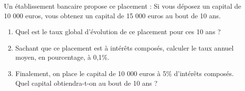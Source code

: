  
Un établissement bancaire propose ce placement :
Si vous déposez un capital de 10 000 euros, vous obtenez un capital de 15 000 euros au bout de 10 ans.
\begin{enumerate} 
\item Quel est le taux global d'évolution de ce placement pour ces 10 ans ?
\item Sachant que ce placement est à intérêts composés, calculer le taux annuel moyen, en pourcentage, à 0,1\%.
\item Finalement, on place le capital de 10 000 euros à 5\% d'intérêts composés. Quel capital obtiendra-t-on au bout de 10 ans ?
\end{enumerate}

 